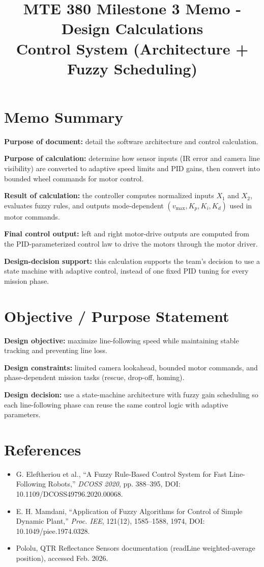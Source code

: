 \documentclass{article}
\begin{document}
\title{MTE 380 Milestone 3 Memo - Design Calculations\\Control System (Architecture + Fuzzy Scheduling)}
\author{}
\date{}
\maketitle

\section*{Memo Summary}
\noindent\textbf{Purpose of document:} detail the software architecture and control calculation.

\noindent\textbf{Purpose of calculation:} determine how sensor inputs (IR error and camera line visibility) are converted to adaptive speed limits and PID gains, then convert into bounded wheel commands for motor control.

\noindent\textbf{Result of calculation:} the controller computes normalized inputs $X_1$ and $X_2$, evaluates fuzzy rules, and outputs mode-dependent $(v_{\max}, K_p, K_i, K_d)$ used in motor commands.

\noindent\textbf{Final control output:} left and right motor-drive outputs are computed from the PID-parameterized control law to drive the motors through the motor driver.

\noindent\textbf{Design-decision support:} this calculation supports the team's decision to use a state machine with adaptive control, instead of one fixed PID tuning for every mission phase.

\section{Objective / Purpose Statement}
\noindent\textbf{Design objective:} maximize line-following speed while maintaining stable tracking and preventing line loss.

\noindent\textbf{Design constraints:} limited camera lookahead, bounded motor commands, and phase-dependent mission tasks (rescue, drop-off, homing).

\noindent\textbf{Design decision:} use a state-machine architecture with fuzzy gain scheduling so each line-following phase can reuse the same control logic with adaptive parameters.

\section{References}
\begin{itemize}
\item G. Eleftheriou et al., ``A Fuzzy Rule-Based Control System for Fast Line-Following Robots,'' \textit{DCOSS 2020}, pp. 388--395, DOI: 10.1109/DCOSS49796.2020.00068.
\item E. H. Mamdani, ``Application of Fuzzy Algorithms for Control of Simple Dynamic Plant,'' \textit{Proc. IEE}, 121(12), 1585--1588, 1974, DOI: 10.1049/piee.1974.0328.
\item Pololu, QTR Reflectance Sensors documentation (readLine weighted-average position), accessed Feb. 2026.
\end{itemize}
\end{document}
